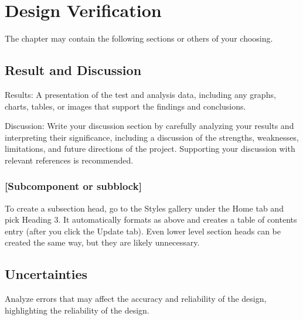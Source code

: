 \clearpage
\section{Design Verification}

The chapter may contain the following sections or others of your choosing.

\subsection{Result and Discussion}

Results: A presentation of the test and analysis data, including any graphs, charts, tables, or images that support the findings and conclusions.

Discussion: Write your discussion section by carefully analyzing your results and interpreting their significance, including a discussion of the strengths, weaknesses, limitations, and future directions of the project. Supporting your discussion with relevant references is recommended.

\subsubsection{[Subcomponent or subblock]}

To create a subsection head, go to the Styles gallery under the Home tab and pick Heading 3. It automatically formats as above and creates a table of contents entry (after you click the Update tab). Even lower level section heads can be created the same way, but they are likely unnecessary.

\subsection{Uncertainties}

Analyze errors that may affect the accuracy and reliability of the design, highlighting the reliability of the design.

